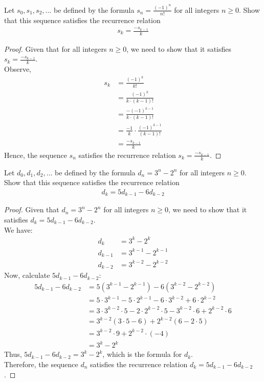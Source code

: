 \documentclass[name=Ojas\ Chaturvedi, emailid=oj.chaturvedi.2024, course=Capstone:\ Discrete\ Math, num=9, deadline={November\ 17,\ 2023}]{homework}
\begin{document}
    Let $s_0, s_1, s_2, \ldots$ be defined by the formula $s_n = \frac{(-1)^n}{n!}$ for all integers $n \geq 0$. Show that this sequence satisfies the recurrence relation
    \begin{align*}
        s_k = \frac{-s_{k-1}}{k}
    \end{align*}
\begin{proof}
    Given that for all integers $n \geq 0$, we need to show that it satisfies $s_k = \frac{-s_{k-1}}{k}$. \\
    Observe,
    \begin{align*}
        s_k &= \frac{(-1)^k}{k!} \\
        &= \frac{(-1)^k}{k \cdot (k-1)!} \\
        &= \frac{-(-1)^{k-1}}{k \cdot (k-1)!} \\
        &= \frac{-1}{k} \cdot \frac{{(-1)}^{k-1}}{(k-1)!} \\
        &= \frac{-s_{k-1}}{k}
    \end{align*}
    Hence, the sequence $s_n$ satisfies the recurrence relation $s_k = \frac{-s_{k-1}}{k}$.
\end{proof}

    Let $d_0, d_1, d_2, \ldots$ be defined by the formula $d_n = 3^n - 2^n$ for all integers $n \geq 0$. Show that this sequence satisfies the recurrence relation
    \begin{align*}
        d_k = 5d_{k-1} - 6d_{k-2}
    \end{align*}
\begin{proof}
    Given that $d_n = 3^n - 2^n$ for all integers $n \geq 0$, we need to show that it satisfies $d_k = 5d_{k-1} - 6d_{k-2}$. \\
    We have:
    \begin{align*}
        d_k &= 3^k - 2^k \\
        d_{k-1} &= 3^{k-1} - 2^{k-1} \\
        d_{k-2} &= 3^{k-2} - 2^{k-2}
    \end{align*}
    Now, calculate $5d_{k-1} - 6d_{k-2}$:
    \begin{align*}
        5d_{k-1} - 6d_{k-2} &= 5(3^{k-1} - 2^{k-1}) - 6(3^{k-2} - 2^{k-2}) \\
        &= 5 \cdot 3^{k-1} - 5 \cdot 2^{k-1} - 6 \cdot 3^{k-2} + 6 \cdot 2^{k-2} \\
        &= 3 \cdot 3^{k-2} \cdot 5 - 2 \cdot 2^{k-2} \cdot 5 - 3^{k-2} \cdot 6 + 2^{k-2} \cdot 6 \\
        &= 3^{k-2} (3 \cdot 5 - 6) + 2^{k-2} (6 - 2 \cdot 5) \\
        &= 3^{k-2} \cdot 9 + 2^{k-2} \cdot (-4) \\
        &= 3^k - 2^k
    \end{align*}
    Thus, $5d_{k-1} - 6d_{k-2} = 3^k - 2^k$, which is the formula for $d_k$. \\
    Therefore, the sequence $d_n$ satisfies the recurrence relation $d_k = 5d_{k-1} - 6d_{k-2}$.
\end{proof}
\end{document}
